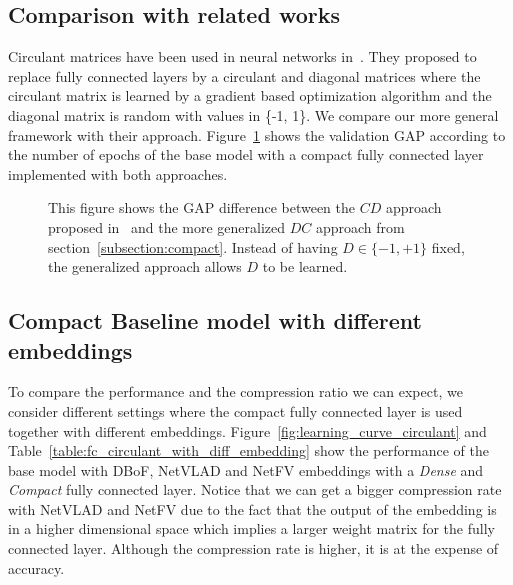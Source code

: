 \documentclass[runningheads]{llncs}
\begin{document}
\subsection{Comparison with related works}
Circulant matrices have been used in neural networks in~\cite{7410684}. They proposed to replace fully connected layers by a circulant and diagonal matrices where the circulant matrix is learned by a gradient based optimization algorithm and the diagonal matrix is random with values in \{-1, 1\}. We compare our more general framework with their approach. Figure~\ref{fig:learning_dc_cd} shows the validation GAP according to the number of epochs of the base model with a compact fully connected layer implemented with both approaches.
\begin{figure}[!htb]
  \centering
  \caption{This figure shows the GAP difference between the $CD$ approach proposed in~\cite{7410684} and the more generalized $DC$ approach from section~\ref{subsection:compact}. Instead of having $D \in \{-1, +1\}$ fixed, the generalized approach allows $D$ to be learned.}
  \label{fig:learning_dc_cd}
\end{figure}


\subsection{Compact Baseline model with different embeddings}
To compare the performance and the compression ratio we can expect, we consider different settings where the compact fully connected layer is used together with different embeddings. Figure~\ref{fig:learning_curve_circulant} and Table~\ref{table:fc_circulant_with_diff_embedding} show the performance of the base model with DBoF, NetVLAD and NetFV embeddings with a \textit{Dense} and \textit{Compact} fully connected layer. Notice that we can get a bigger compression rate with NetVLAD and NetFV due to the fact that the output of the embedding is in a higher dimensional space which implies a larger weight matrix for the fully connected layer. Although the compression rate is higher, it is at the expense of accuracy.
\end{document}
